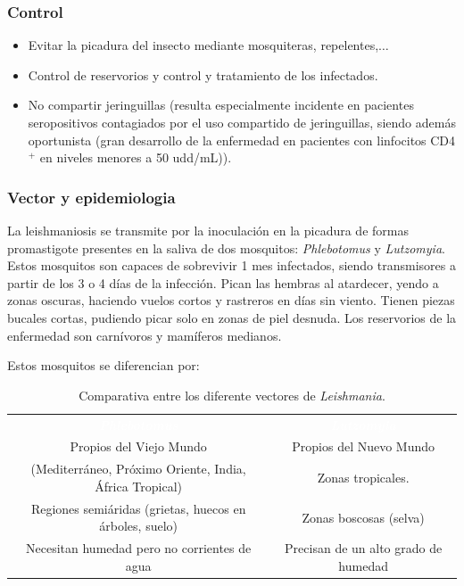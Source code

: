 \subsubsection{Control}
\begin{itemize}[itemsep=0pt,parsep=0pt,topsep=0pt,partopsep=0pt] 
	\item Evitar la picadura del insecto mediante mosquiteras, repelentes,$\dots$
	\item Control de reservorios y control y tratamiento de los infectados.
	\item No compartir jeringuillas (resulta especialmente incidente en pacientes seropositivos contagiados por el uso compartido de jeringuillas, siendo además oportunista (gran desarrollo de la enfermedad en pacientes con linfocitos CD4$^+$ en niveles menores a 50 udd/mL)).
\end{itemize}
\subsubsection{Vector y epidemiologia}
La leishmaniosis se transmite por la inoculación en la picadura de formas promastigote presentes en la saliva de dos mosquitos: \textit{Phlebotomus} y \textit{Lutzomyia}. Estos mosquitos son capaces de sobrevivir 1 mes infectados, siendo transmisores a partir de los 3 o 4 días de la infección. Pican las hembras al atardecer, yendo a zonas oscuras, haciendo vuelos cortos y rastreros en días sin viento. Tienen piezas bucales cortas, pudiendo picar solo en zonas de piel desnuda. Los reservorios de la enfermedad son carnívoros y mamíferos medianos.

Estos mosquitos se diferencian por:
\begin{table}[H]
	\centering
	\begin{tabular}{cc}
		\rowcolor{black}\textcolor{white}{\textit{\textbf{Phlebotomus}}}&\textcolor{white}{\textit{\textbf{Lutzomyia}}}\\
		Propios del Viejo Mundo&Propios del Nuevo Mundo\\
		(Mediterráneo, Próximo Oriente, India, África Tropical)&Zonas tropicales.\\
		\rowcolor{hiperlightgray}Regiones semiáridas (grietas, huecos en árboles, suelo)&Zonas boscosas (selva)\\
		Necesitan humedad pero no corrientes de agua&Precisan de un alto grado de humedad\\
		\hline
	\end{tabular}
	\caption{Comparativa entre los diferente vectores de \textit{Leishmania}.}
\end{table}
